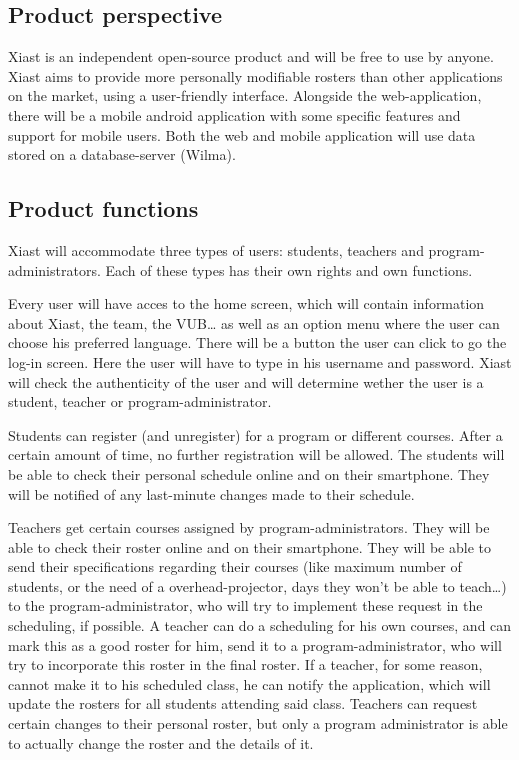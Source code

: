 \documentclass[9pt]{article}
\begin{document}
\subsection{Product perspective}\label{product-perspective}

Xiast is an independent open-source product and will be free to use by
anyone. Xiast aims to provide more personally modifiable rosters than
other applications on the market, using a user-friendly interface.
Alongside the web-application, there will be a mobile android
application with some specific features and support for mobile users.
Both the web and mobile application will use data stored on a
database-server (Wilma).

\subsection{Product functions}\label{product-functions}

Xiast will accommodate three types of users: students, teachers and
program-administrators. Each of these types has their own rights and own
functions.

Every user will have acces to the home screen, which will contain
information about Xiast, the team, the VUB\ldots{} as well as an option
menu where the user can choose his preferred language. There will be a
button the user can click to go the log-in screen. Here the user will
have to type in his username and password. Xiast will check the
authenticity of the user and will determine wether the user is a
student, teacher or program-administrator.

Students can register (and unregister) for a program or different
courses. After a certain amount of time, no further registration will be
allowed. The students will be able to check their personal schedule
online and on their smartphone. They will be notified of any last-minute
changes made to their schedule.

Teachers get certain courses assigned by program-administrators. They
will be able to check their roster online and on their smartphone. They
will be able to send their specifications regarding their courses (like
maximum number of students, or the need of a overhead-projector, days
they won't be able to teach\ldots{}) to the program-administrator, who
will try to implement these request in the scheduling, if possible. A
teacher can do a scheduling for his own courses, and can mark this as a
good roster for him, send it to a program-administrator, who will try to
incorporate this roster in the final roster. If a teacher, for some
reason, cannot make it to his scheduled class, he can notify the
application, which will update the rosters for all students attending
said class. Teachers can request certain changes to their personal
roster, but only a program administrator is able to actually change the
roster and the details of it.
\end{document}
